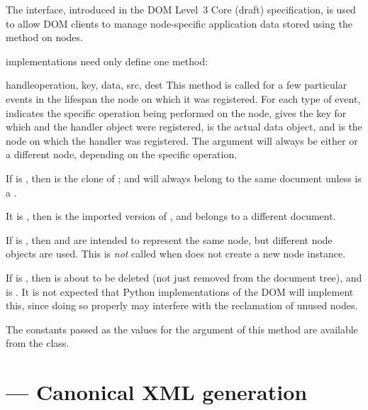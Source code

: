 \documentclass{howto}
\begin{document}
The  interface, introduced in the DOM Level~3
Core (draft) specification, is used to allow DOM clients to manage
node-specific application data stored using the 
method on nodes.

 implementations need only define one method:

\begin{methoddesc}[UserDataHandler]{handle}{operation, key, data, src, dest}
  This method is called for a few particular events in the lifespan
  the node on which it was registered.  For each type of event,
   indicates the specific operation being performed on
  the node,  gives the key for which  and the
  handler object were registered,  is the actual data
  object, and  is the node on which the handler was
  registered.  The  argument will always be either
   or a different node, depending on the specific
  operation.

  If  is , then  is the
  clone of ;  and  will always belong to
  the same document unless  is a
  .

  It  is , then  is
  the imported version of , and belongs to a different
  document.

  If  is , then  and
   are intended to represent the same node, but different
  node objects are used.  This is \emph{not} called when
   does not create a new node instance.

  If  is , then  is
  about to be deleted (not just removed from the document tree), and
   is .  It is not expected that Python
  implementations of the DOM will implement this, since doing so
  properly may interfere with the reclamation of unused nodes.

  The constants passed as the values for the  argument
  of this method are available from the
   class.
\end{methoddesc}


\section{ ---
         Canonical XML generation}
\end{document}
